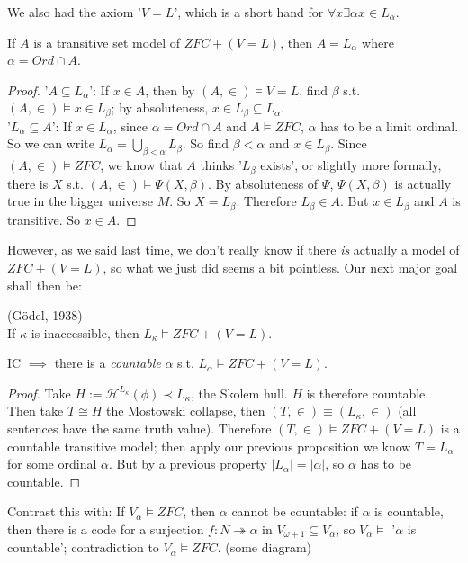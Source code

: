 \documentclass[a4paper]{article}
\begin{document}
We also had the axiom '$V=L$', which is a short hand for $\forall x \exists \alpha x\in L_\alpha$.

\begin{prop}
If $A$ is a transitive set model of $ZFC+(V=L)$, then $A=L_\alpha$ where $\alpha = Ord \cap A$.
\begin{proof}
'$A \subseteq L_\alpha$': If $x \in A$, then by $(A,\in) \vDash V=L$, find $\beta$ s.t. $(A,\in) \vDash x \in L_\beta$; by absoluteness, $x \in L_\beta \subseteq L_\alpha$.\\
'$L_\alpha \subseteq A$': If $x \in L_\alpha$, since $\alpha = Ord\cap A$ and $A \vDash ZFC$, $\alpha$ has to be a limit ordinal. So we can write $L_\alpha = \bigcup_{\beta < \alpha} L_\beta$. So find $\beta < \alpha$ and $x \in L_\beta$. Since $(A,\in) \vDash ZFC$, we know that $A$ thinks '$L_\beta$ exists', or slightly more formally, there is $X$ s.t. $(A,\in) \vDash \Psi(X,\beta)$. By absoluteness of $\Psi$, $\Psi(X,\beta)$ is actually true in the bigger universe $M$. So $X=L_\beta$. Therefore $L_\beta \in A$. But $x \in L_\beta$ and $A$ is transitive. So $x \in A$.
\end{proof}
\end{prop}

However, as we said last time, we don't really know if there \emph{is} actually a model of $ZFC+(V=L)$, so what we just did seems a bit pointless. Our next major goal shall then be:

\begin{thm} (G\"{o}del, 1938)\\
If $\kappa$ is inaccessible, then $L_\kappa \vDash ZFC+(V=L)$.
\end{thm}

\begin{coro}
IC $\implies$ there is a \emph{countable} $\alpha$ s.t. $L_\alpha \vDash ZFC+(V=L)$.
\begin{proof}
Take $H:=\mathcal{H}^{L_\kappa}(\phi) \prec L_\kappa$, the Skolem hull. $H$ is therefore countable. Then take $T \cong H$ the Mostowski collapse, then $(T,\in) \equiv (L_\kappa,\in)$ (all sentences have the same truth value). Therefore $(T,\in) \vDash ZFC+(V=L)$ is a countable transitive model; then apply our previous proposition we know $T=L_\alpha$ for some ordinal $\alpha$. But by a previous property $|L_\alpha| = |\alpha|$, so $\alpha$ has to be countable.
\end{proof}
\end{coro}

Contrast this with: If $V_\alpha \vDash ZFC$, then $\alpha$ cannot be countable: if $\alpha$ is countable, then there is a code for a surjection $f:N \twoheadrightarrow \alpha$ in $V_{\omega+1} \subseteq V_\alpha$, so $V_\alpha \vDash$ '$\alpha$ is countable'; contradiction to $V_\alpha \vDash ZFC$. (some diagram)
\end{document}
